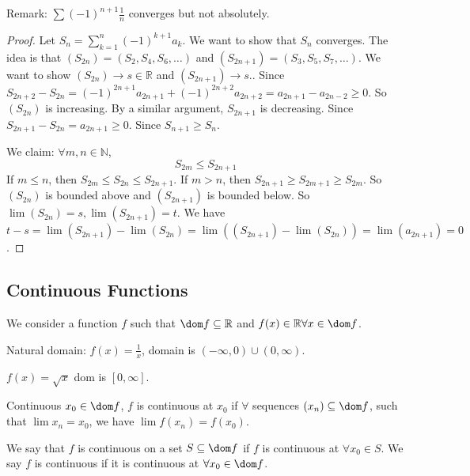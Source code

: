 \documentclass{report}
\begin{document}
Remark: $\sum(-1)^{n + 1}\frac{1}{n}$ converges but not absolutely.
    \begin{proof}
        Let $S_{n} = \sum_{k = 1}^{n}(-1)^{k + 1}a_{k}$. We want to show that $S_{n}$ converges. The idea is that $(S_{2n}) = (S_{2}, S_{4}, S_{6}, \ldots )$ and $(S_{2n + 1}) = (S_{3}, S_{5}, S_{7}, \ldots )$. We want to show $(S_{2n}) \rightarrow s \in \mathbb{R}$ and $(S_{2n + 1}) \rightarrow s$.. Since $S_{2n + 2} -  S_{2n} = (-1)^{2n + 1}a_{2n + 1} + (-1)^{2n + 2}a_{2n + 2} = a_{2n + 1} - a_{2n - 2} \geq 0$. So $(S_{2n})$ is increasing. By a similar argument, $S_{2n + 1}$ is decreasing. Since $S_{2n + 1} - S_{2n} = a_{2n + 1} \geq 0$. Since $S_{n + 1} \geq S_{n}$.

        We claim: $\forall m, n \in \mathbb{N}$,
            \begin{equation*}
                S_{2m} \leq S_{2n + 1}
            \end{equation*}
        If $m \leq n$, then $S_{2m} \leq S_{2n} \leq S_{2n + 1}$. If $m > n$, then $S_{2n + 1} \geq S_{2m + 1} \geq S_{2m}$. So $(S_{2n})$ is bounded above and $(S_{2n + 1})$ is bounded below. So $\lim(S_{2n}) = s, \lim(S_{2n + 1}) = t$. We have $t - s = \lim(S_{2n + 1}) - \lim(S_{2n}) = \lim((S_{2n + 1}) - \lim(S_{2n})) = \lim(a_{2n + 1}) = 0$.
    \end{proof}

\begin{topic}
    \section{Continuous Functions}
\end{topic}

We consider a function $f$ such that $\dom f \subseteq \mathbb{R}$ and $f(x) \in \mathbb{R} \forall x \in \dom f$.

Natural domain: $f(x) = \frac{1}{x}$, domain is $(-\infty, 0) \cup (0, \infty)$.

$f(x) = \sqrt{x}$ dom is $[0, \infty]$.

\begin{definition}{Continuous}
    $x_{0} \in \dom f$, $f$ is continuous at $x_{0}$ if $\forall $ sequences $(x_{n}) \subseteq \dom f$, such that $\lim x_{n} = x_{0}$, we have $\lim f(x_{n}) = f(x_{0})$.
\end{definition}

We say that $f$ is continuous on a set $S \subseteq \dom f$ if $f$ is continuous at $\forall x_{0} \in S$. We say $f$ is continuous if it is continuous at $\forall x_{0} \in \dom f$.
\end{document}

